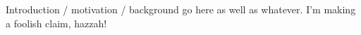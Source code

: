 Introduction / motivation / background go here as well as whatever. I'm making a foolish claim\cite{rosenblatt1956central}, hazzah!
